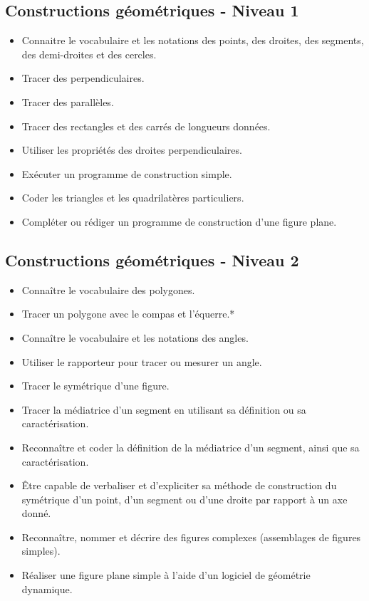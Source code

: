 \documentclass[a4paper,12pt,fleqn]{article}		
\begin{document}
\renewcommand{\labelitemi}{}

\subsection*{Constructions géométriques - Niveau 1}

\begin{itemize}
	\item {}Connaitre le vocabulaire et les notations des points, des droites, des segments, des demi-droites et des cercles. 
	\item {}Tracer des perpendiculaires.
	\item {}Tracer des parallèles.
	\item {}Tracer des rectangles et des carrés de longueurs données.
	\item {}Utiliser les propriétés des droites perpendiculaires.
	\item {}Exécuter un programme de construction simple.
	\item {}Coder les triangles et les quadrilatères particuliers.
	\item {}Compléter ou rédiger un programme de construction d’une figure plane.
\end{itemize}

\subsection*{Constructions géométriques - Niveau 2}

\begin{itemize}
	\item {}Connaître le vocabulaire des polygones.
	\item {}Tracer un polygone avec le compas et l’équerre.*
	\item {}Connaître le vocabulaire et les notations des angles. %
	\item {}Utiliser le rapporteur pour tracer ou mesurer un angle.
	\item {}Tracer le symétrique d’une figure. %
	\item {}Tracer la médiatrice d’un segment en utilisant sa définition ou sa caractérisation.
	\item {}Reconnaître et coder la définition de la médiatrice d’un segment, ainsi que sa caractérisation.
	\item {}Être capable de verbaliser et d’expliciter sa méthode de construction du symétrique d’un point, d’un segment ou d’une droite par rapport à un axe donné.
	\item {}Reconnaître, nommer et décrire des figures complexes (assemblages de figures simples).
	\item {}Réaliser une figure plane simple à l’aide d’un logiciel de géométrie dynamique.
\end{itemize}
\end{document}
